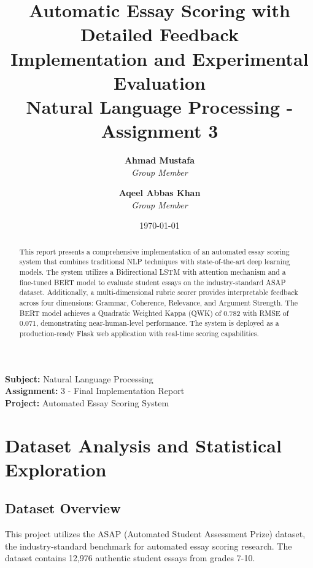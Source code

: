 \documentclass[12pt,a4paper]{article}
\title{\textbf{Automatic Essay Scoring with Detailed Feedback}\\
\large Implementation and Experimental Evaluation\\
\vspace{0.5cm}
\large Natural Language Processing - Assignment 3}
\author{
    \textbf{Ahmad Mustafa}\\
    \textit{Group Member}\\
    \and
    \textbf{Aqeel Abbas Khan}\\
    \textit{Group Member}
}
\date{\today}
\begin{document}
\maketitle
\thispagestyle{empty}

\begin{center}
\vspace{1cm}
\large
\textbf{Subject:} Natural Language Processing\\
\textbf{Assignment:} 3 - Final Implementation Report\\
\textbf{Project:} Automated Essay Scoring System\\
\end{center}

\vfill

\begin{abstract}
This report presents a comprehensive implementation of an automated essay scoring system that combines traditional NLP techniques with state-of-the-art deep learning models. The system utilizes a Bidirectional LSTM with attention mechanism and a fine-tuned BERT model to evaluate student essays on the industry-standard ASAP dataset. Additionally, a multi-dimensional rubric scorer provides interpretable feedback across four dimensions: Grammar, Coherence, Relevance, and Argument Strength. The BERT model achieves a Quadratic Weighted Kappa (QWK) of 0.782 with RMSE of 0.071, demonstrating near-human-level performance. The system is deployed as a production-ready Flask web application with real-time scoring capabilities.
\end{abstract}

\newpage
\tableofcontents
\newpage

\section{Dataset Analysis and Statistical Exploration}

\subsection{Dataset Overview}
This project utilizes the ASAP (Automated Student Assessment Prize) dataset, the industry-standard benchmark for automated essay scoring research. The dataset contains 12,976 authentic student essays from grades 7-10.
\end{document}
